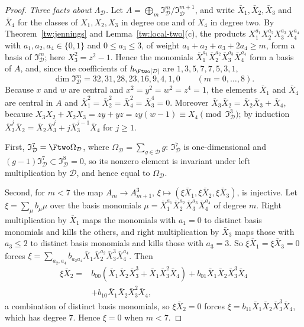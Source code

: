 \begin{proof}
\emph{Three facts about $\Lambda_{\mathcal D}$.} Let $A=\bigoplus_m\mathfrak I_{\mathcal D}^m/\mathfrak I_{\mathcal D}^{m+1}$,
and write $\bar X_1,\bar X_2,\bar X_3$ and $\bar X_4$ for the classes of $X_1,X_2,X_3$ in degree one and
of $X_4$ in degree two. By Theorem~\ref{tw:jennings} and
Lemma~\ref{tw:local-two}(c), the products
$X_1^{a_1}X_2^{a_2}X_3^{a_3}X_4^{a_4}$ with $a_1,a_2,a_4\in\{0,1\}$ and
$0\le a_3\le3$, of weight $a_1+a_2+a_3+2a_4\ge m$, form a basis of
$\mathfrak I_{\mathcal D}^m$; here $X_3^2=z^2-1$. Hence the monomials
$\bar X_1^{a_1}\bar X_2^{a_2}\bar X_3^{a_3}\bar X_4^{a_4}$ form a basis of $A$, and, since the
coefficients of $h_{\Ftwo[\mathcal D]}$ are $1,3,5,7,7,5,3,1$,
\[
 \dim\mathfrak I_{\mathcal D}^m=32,31,28,23,16,9,4,1,0\qquad(m=0,\dots,8).
\]
Because $x$ and $w$ are central and $x^2=y^2=w^2=z^4=1$, the elements $\bar X_1$
and $\bar X_4$ are central in $A$ and $\bar X_1^2=\bar X_2^2=\bar X_4^2=\bar X_3^4=0$. Moreover $\bar X_3\bar X_2=\bar X_2\bar X_3+\bar X_4$,
because $X_3X_2+X_2X_3=zy+yz=zy(w-1)\equiv X_4\pmod{\mathfrak I_{\mathcal D}^3}$; by
induction $\bar X_3^j\bar X_2=\bar X_2\bar X_3^j+j\bar X_3^{j-1}\bar X_4$ for $j\ge1$.

First, $\mathfrak I_{\mathcal D}^7=\Ftwo\Omega_{\mathcal D}$, where $\Omega_{\mathcal D}=\sum_{g\in \mathcal D}g$:
$\mathfrak I_{\mathcal D}^7$ is one-dimensional and $(g-1)\mathfrak I_{\mathcal D}^7\subset\mathfrak I_{\mathcal D}^8=0$,
so its nonzero element is invariant under left multiplication by $\mathcal D$, and
hence equal to $\Omega_{\mathcal D}$.

Second, for $m<7$ the map $A_m\to A_{m+1}^3$, $\xi\mapsto(\xi\bar X_1,\xi\bar X_2,\xi\bar X_3)$,
is injective. Let $\xi=\sum_\mu b_\mu\mu$ over the basis monomials
$\mu=\bar X_1^{a_1}\bar X_2^{a_2}\bar X_3^{a_3}\bar X_4^{a_4}$ of degree $m$. Right multiplication by $\bar X_1$
maps the monomials with $a_1=0$ to distinct basis monomials and kills the
others, and right multiplication by $\bar X_3$ maps those with $a_3\le2$ to
distinct basis monomials and kills those with $a_3=3$. So $\xi\bar X_1=\xi\bar X_3=0$
forces $\xi=\sum_{a_2,a_4}b_{a_2a_4}\bar X_1\bar X_2^{a_2}\bar X_3^3\bar X_4^{a_4}$. Then
\begin{align*}
 \xi\bar X_2={}&b_{00}(\bar X_1\bar X_2\bar X_3^3+\bar X_1\bar X_3^2\bar X_4)
 +b_{01}\bar X_1\bar X_2\bar X_3^3\bar X_4\\
 &+b_{10}\bar X_1\bar X_2\bar X_3^2\bar X_4,
\end{align*}
a combination of distinct basis monomials, so $\xi\bar X_2=0$ forces
$\xi=b_{11}\bar X_1\bar X_2\bar X_3^3\bar X_4$, which has degree $7$. Hence $\xi=0$ when $m<7$.


\end{proof}
